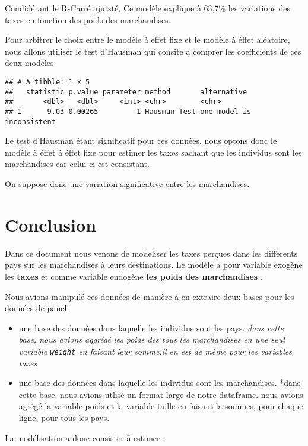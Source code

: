 \documentclass[
]{book}
\providecommand{\tightlist}{%
  \setlength{\itemsep}{0pt}\setlength{\parskip}{0pt}}
\begin{document}
Condidérant le R-Carré ajutsté, Ce modèle explique à 63,7\% les variations des taxes en fonction des poids des marchandises.

Pour arbitrer le choix entre le modèle à effet fixe et le modèle à éffet aléatoire, nous allons utiliser le test d'Hausman qui consite à comprer les coefficients de ces deux modèles

\begin{verbatim}
## # A tibble: 1 x 5
##   statistic p.value parameter method       alternative              
##       <dbl>   <dbl>     <int> <chr>        <chr>                    
## 1      9.03 0.00265         1 Hausman Test one model is inconsistent
\end{verbatim}

Le test d'Hausman étant significatif pour ces données, nous optons donc le modèle à éffet à éffet fixe pour estimer les taxes sachant que les individus sont les marchandises car celui-ci est consistant.

On suppose donc une variation significative entre les marchandises.

\hypertarget{conclusion}{%
\chapter{Conclusion}\label{conclusion}}

Dans ce document nous venons de modeliser les taxes perçues dans les différents pays sur les marchandises à leurs destinations. Le modèle a pour variable exogène les \textbf{taxes} et comme variable endogène \textbf{les poids des marchandises} .

Nous avions manipulé ces données de manière à en extraire deux bases pour les données de panel:

\begin{itemize}
\tightlist
\item
  une base des données dans laquelle les individus sont les pays.
  \emph{dans cette base, nous avions aggrégé les poids des tous les marchandises en une seul variable \texttt{weight} en faisant leur somme.il en est de même pour les variables taxes}
\item
  une base des données dans laquelle les individus sont les marchandises.
  *dans cette base, nous avions utlisé un format large de notre dataframe. nous avions agrégé la variable poids et la variable taille en faisant la sommes, pour chaque ligne, pour tous les pays.
\end{itemize}

La modélisation a donc consister à estimer :
\end{document}
